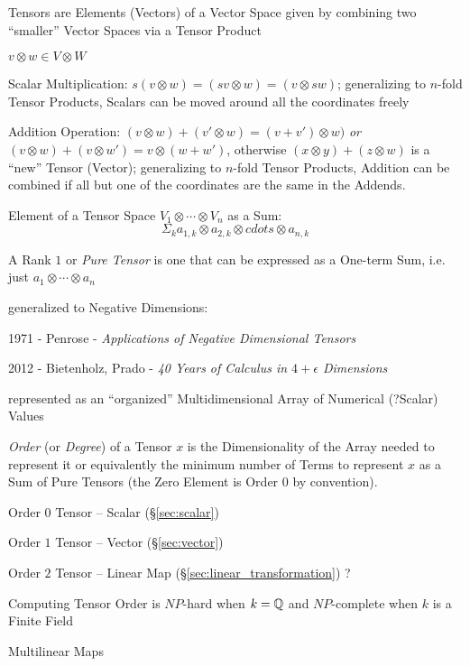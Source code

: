Tensors are Elements (Vectors) of a Vector Space given by
combining two ``smaller'' Vector Spaces via a Tensor Product

$v \otimes w \in V \otimes W$

Scalar Multiplication: $s(v \otimes w) = (sv \otimes w) = (v \otimes
sw)$; generalizing to  $n$-fold Tensor Products, Scalars can be moved
around all the coordinates freely

Addition Operation: $(v \otimes w) + (v' \otimes w) = (v + v') \otimes
w)$ \emph{or} $(v \otimes w) + (v \otimes w') = v \otimes (w + w')$,
otherwise $(x \otimes y) + (z \otimes w)$ is a ``new'' Tensor
(Vector); generalizing to $n$-fold Tensor Products, Addition can be
combined if all but one of the coordinates are the same in the
Addends.

Element of a Tensor Space $V_1 \otimes \cdots \otimes V_n$ as a Sum:
\[
  \Sigma_k a_{1,k} \otimes a_{2,k} \otimes cdots \otimes a_{n,k}
\]

A Rank $1$ or \emph{Pure Tensor} is one that can be expressed as a
One-term Sum, i.e. just $a_1 \otimes \cdots \otimes a_n$


\asterism

generalized to Negative Dimensions:

1971 - Penrose - \emph{Applications of Negative Dimensional Tensors}

2012 - Bietenholz, Prado - \emph{40 Years of Calculus in $4 + \epsilon$
  Dimensions}


\asterism


represented as an ``organized'' Multidimensional Array of Numerical
(?Scalar) Values

\emph{Order} (or \emph{Degree}) of a Tensor $x$ is the
Dimensionality of the Array needed to represent it or equivalently the
minimum number of Terms to represent $x$ as a Sum of Pure Tensors (the
Zero Element is Order $0$ by convention).

Order $0$ Tensor -- Scalar (\S\ref{sec:scalar})

Order $1$ Tensor -- Vector (\S\ref{sec:vector})

Order $2$ Tensor -- Linear Map (\S\ref{sec:linear_transformation}) ?

Computing Tensor Order is $NP$-hard when $k = \mathbb{Q}$ and $NP$-complete
when $k$ is a Finite Field %


\asterism


Multilinear Maps


\asterism


